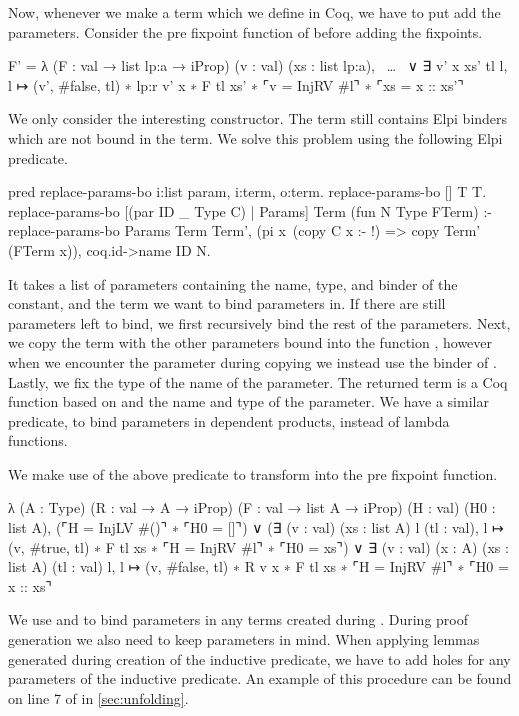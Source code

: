 \documentclass[thesis.tex]{subfiles}
\begin{document}
{Now, whenever we make a term which we define in Coq, we have to put add the parameters. Consider the pre fixpoint function of  before adding the fixpoints.
\begin{elpicode}
  F' = {{
    λ (F : val → list lp:a → iProp) 
      (v : val) (xs : list lp:a),
      ~\ldots~
    ∨ ∃ v' x xs' tl l, 
        l ↦ (v', #false, tl) ∗ lp:r v' x ∗ F tl xs' ∗ 
        ⌜v = InjRV #l⌝ ∗ ⌜xs = x :: xs'⌝
  }}
\end{elpicode}
We only consider the interesting constructor. The term still contains Elpi binders which are not bound in the term. We solve this problem using the following Elpi predicate.
\begin{elpicode}
  pred replace-params-bo i:list param, i:term, o:term.
  replace-params-bo [] T T.
  replace-params-bo [(par ID _ Type C) | Params] 
                    Term (fun N Type FTerm) :-
    replace-params-bo Params Term Term',
    (pi x\ (copy C x :- !) => copy Term' (FTerm x)),
    coq.id->name ID N.
\end{elpicode}
It takes a list of parameters containing the name, type, and binder of the constant, and the term we want to bind parameters in. If there are still parameters left to bind, we first recursively bind the rest of the parameters. Next, we copy the term with the other parameters bound into the function , however when we encounter the parameter during copying we instead use the binder of . Lastly, we fix the type of the name of the parameter. The returned term is a Coq function based on  and the name and type of the parameter. We have a similar predicate,  to bind parameters in dependent products, instead of lambda functions.

We make use of the above predicate to transform  into the pre fixpoint function.
\begin{coqcode}
  λ (A : Type) (R : val → A → iProp) 
    (F : val → list A → iProp) 
    (H : val) (H0 : list A),
      (⌜H = InjLV #()⌝ ∗ ⌜H0 = []⌝)
    ∨ (∃ (v : val) (xs : list A) l (tl : val), 
         l ↦ (v, #true, tl) ∗ F tl xs ∗ 
         ⌜H = InjRV #l⌝ ∗ ⌜H0 = xs⌝)
    ∨ ∃ (v : val) (x : A) (xs : list A) (tl : val) l, 
        l ↦ (v, #false, tl) ∗ R v x ∗ F tl xs ∗ 
        ⌜H = InjRV #l⌝ ∗ ⌜H0 = x :: xs⌝
\end{coqcode}

We use  and  to bind parameters in any terms created during . During proof generation we also need to keep parameters in mind. When applying lemmas generated during creation of the inductive predicate, we have to add holes for any parameters of the inductive predicate. An example of this procedure can be found on line 7 of  in \cref{sec:unfolding}.

}
\end{document}
